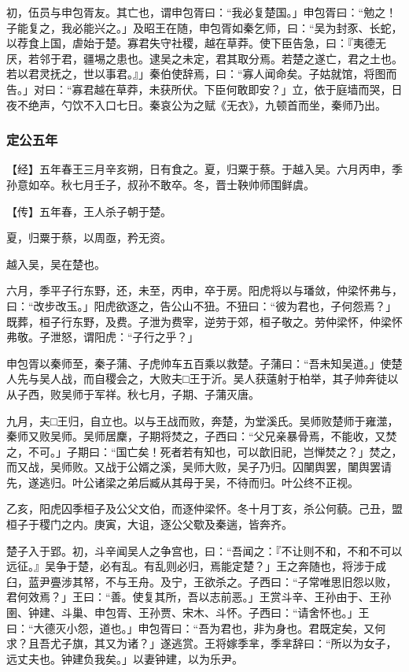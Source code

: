 \documentclass[]{article}
\begin{document}
初，伍员与申包胥友。其亡也，谓申包胥曰：``我必复楚国。」申包胥曰：``勉之！子能复之，我必能兴之。」及昭王在随，申包胥如秦乞师，曰：``吴为封豕、长蛇，以荐食上国，虐始于楚。寡君失守社稷，越在草莽。使下臣告急，曰：『夷德无厌，若邻于君，疆埸之患也。逮吴之未定，君其取分焉。若楚之遂亡，君之土也。若以君灵抚之，世以事君。』」秦伯使辞焉，曰：``寡人闻命矣。子姑就馆，将图而告。」对曰：``寡君越在草莽，未获所伏。下臣何敢即安？」立，依于庭墙而哭，日夜不绝声，勺饮不入口七日。秦哀公为之赋《无衣》，九顿首而坐，秦师乃出。

\hypertarget{header-n2919}{%
\subsubsection{定公五年}\label{header-n2919}}

【经】五年春王三月辛亥朔，日有食之。夏，归粟于蔡。于越入吴。六月丙申，季孙意如卒。秋七月壬子，叔孙不敢卒。冬，晋士鞅帅师围鲜虞。

【传】五年春，王人杀子朝于楚。

夏，归粟于蔡，以周亟，矜无资。

越入吴，吴在楚也。

六月，季平子行东野，还，未至，丙申，卒于房。阳虎将以与璠敛，仲梁怀弗与，曰：``改步改玉。」阳虎欲逐之，告公山不狃。不狃曰：``彼为君也，子何怨焉？」既葬，桓子行东野，及费。子泄为费宰，逆劳于郊，桓子敬之。劳仲梁怀，仲梁怀弗敬。子泄怒，谓阳虎：``子行之乎？」

申包胥以秦师至，秦子蒲、子虎帅车五百乘以救楚。子蒲曰：``吾未知吴道。」使楚人先与吴人战，而自稷会之，大败夫□王于沂。吴人获薳射于柏举，其子帅奔徒以从子西，败吴师于军祥。秋七月，子期、子蒲灭唐。

九月，夫□王归，自立也。以与王战而败，奔楚，为堂溪氏。吴师败楚师于雍澨，秦师又败吴师。吴师居麇，子期将焚之，子西曰：``父兄亲暴骨焉，不能收，又焚之，不可。」子期曰：``国亡矣！死者若有知也，可以歆旧祀，岂惮焚之？」焚之，而又战，吴师败。又战于公婿之溪，吴师大败，吴子乃归。囚闉舆罢，闉舆罢请先，遂逃归。叶公诸梁之弟后臧从其母于吴，不待而归。叶公终不正视。

乙亥，阳虎囚季桓子及公父文伯，而逐仲梁怀。冬十月丁亥，杀公何藐。己丑，盟桓子于稷门之内。庚寅，大诅，逐公父歜及秦遄，皆奔齐。

楚子入于郢。初，斗辛闻吴人之争宫也，曰：``吾闻之：『不让则不和，不和不可以远征。』吴争于楚，必有乱。有乱则必归，焉能定楚？」王之奔随也，将涉于成臼，蓝尹亹涉其帑，不与王舟。及宁，王欲杀之。子西曰：``子常唯思旧怨以败，君何效焉？」王曰：``善。使复其所，吾以志前恶。」王赏斗辛、王孙由于、王孙圉、钟建、斗巢、申包胥、王孙贾、宋木、斗怀。子西曰：``请舍怀也。」王曰：``大德灭小怨，道也。」申包胥曰：``吾为君也，非为身也。君既定矣，又何求？且吾尤子旗，其又为诸？」遂逃赏。王将嫁季芈，季芈辞曰：``所以为女子，远丈夫也。钟建负我矣。」以妻钟建，以为乐尹。
\end{document}
